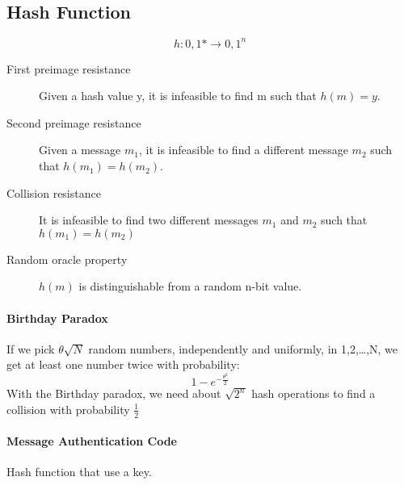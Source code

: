 \subsection{Hash Function}
$$h:{0,1}*\rightarrow{0,1}^n$$
\begin{description}
    \item[First preimage resistance] Given a hash value y, it is infeasible to
    find m such that $h(m) = y$.
    \item[Second preimage resistance] Given a message $m_1$, it is infeasible
    to find a different message $m_2$ such that $h(m_1)=h(m_2)$.
    \item[Collision resistance] It is infeasible to find two different messages
    $m_1$ and $m_2$ such that $h(m_1)=h(m_2)$
    \item[Random oracle property] $h(m)$ is distinguishable from a random n-bit
    value.
\end{description}

\paragraph{Birthday Paradox} If we pick $\theta\sqrt{N}$ random numbers,
independently and uniformly, in {1,2,\ldots,N}, we get at least one number twice
with probability:
$$1-e^{-\frac{\theta^2}{2}}$$
With the Birthday paradox, we need about $\sqrt{2^n}$ hash operations to find a
collision with probability $\frac{1}{2}$
\paragraph{Message Authentication Code} Hash function that use a key.


